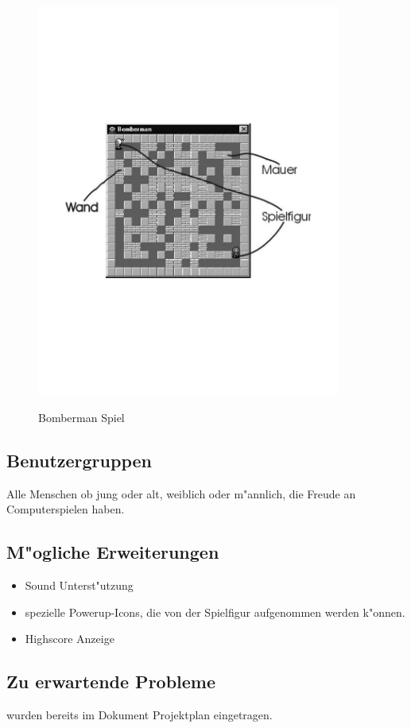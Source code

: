 \begin{figure}[H]
  \begin{center}
    \includegraphics[width=10cm]{./images/bomber.pdf} \\
  \end{center}
  \caption{Bomberman Spiel}
\end{figure}

\subsection{Benutzergruppen}
Alle Menschen ob jung oder alt, weiblich oder m"annlich, die Freude an Computerspielen haben.

\subsection{M"ogliche Erweiterungen}
\begin{itemize}
\item Sound Unterst"utzung
\item spezielle Powerup-Icons, die von der Spielfigur aufgenommen werden k"onnen.
\item Highscore Anzeige
\end{itemize}

\subsection{Zu erwartende Probleme}
wurden bereits im Dokument Projektplan eingetragen.

